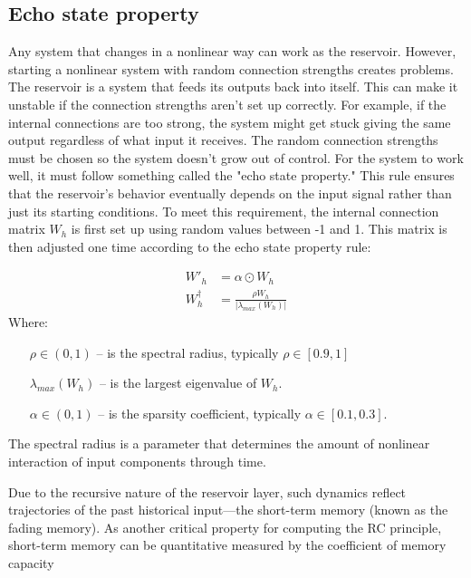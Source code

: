 \documentclass[11pt, oneside]{article}
\begin{document}
\subsection{Echo state property}

Any system that changes in a nonlinear way can work as the reservoir. However, starting a nonlinear system with random connection strengths creates problems.
The reservoir is a system that feeds its outputs back into itself. This can make it unstable if the connection strengths aren't set up correctly. For example, if the internal connections are too strong, the system might get stuck giving the same output regardless of what input it receives. The random connection strengths must be chosen so the system doesn't grow out of control.
For the system to work well, it must follow something called the "echo state property." This rule ensures that the reservoir's behavior eventually depends on the input signal rather than just its starting conditions.
To meet this requirement, the internal connection matrix \(W_h\) is first set up using random values between -1 and 1. This matrix is then adjusted one time according to the echo state property rule:

\begin{align}
    W'_h          & = \alpha \odot {W_h}                                             \\
    W_h^{\dagger} & = \frac{\rho  W_h}{\left\lvert \lambda_{max}(W_h) \right\rvert }
\end{align}
Where:
\begin{itemize}[noitemsep, leftmargin=4cm, label={}]
    \item [\(\rho \in (0,1)\)] -- is the spectral radius, typically \(\rho \in [0.9, 1]\)
    \item [\(\lambda_{max}(W_h)\)] -- is the largest eigenvalue of \(W_h \).
    \item[\(\alpha \in (0,1)\)] -- is the sparsity coefficient, typically \(\alpha \in [0.1, 0.3]\).
\end{itemize}
The spectral radius is a parameter that determines the amount of nonlinear interaction of input components through time.

Due to the recursive nature of the reservoir layer,
such dynamics reflect trajectories of the past historical input—the short-term memory (known as the fading memory). As another critical property for computing the RC principle, short-term memory can be
quantitative measured by the coefficient of memory
capacity
\end{document}
